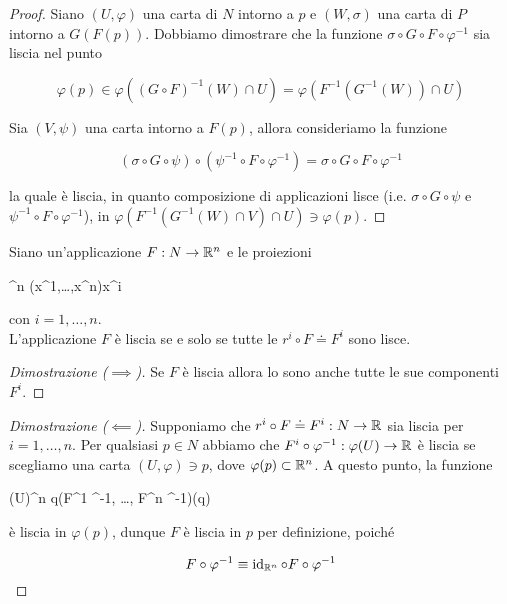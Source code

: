 \begin{proof}
	Siano $ (U,\varphi) $ una carta di $ N $ intorno a $ p $ e $ (W,\sigma) $ una carta di $ P $ intorno a $ G(F(p)) $. Dobbiamo dimostrare che la funzione $ \sigma \circ G \circ F \circ \varphi^{-1} $ sia liscia nel punto
	
	\begin{equation}
		\varphi(p) \in \varphi((G \circ F)^{-1}(W) \cap U) = \varphi(F^{-1}(G^{-1}(W)) \cap U)
	\end{equation}
	
	Sia $ (V,\psi) $ una carta intorno a $ F(p) $, allora consideriamo la funzione
	
	\begin{equation}
		(\sigma \circ G \circ \psi) \circ (\psi^{-1} \circ F \circ \varphi^{-1}) = \sigma \circ G \circ F \circ \varphi^{-1}
	\end{equation}

	la quale è liscia, in quanto composizione di applicazioni lisce (i.e. $ \sigma \circ G \circ \psi $ e $ \psi^{-1} \circ F \circ \varphi^{-1} $), in $ \varphi(F^{-1}(G^{-1}(W) \cap V) \cap U) \ni \varphi(p) $.
\end{proof}

\begin{definition}[Componenti]\label{prop:map-comp}
	Siano un'applicazione $ F : N \to \mathbb{R}^{n} $ e le proiezioni
	
		{\R^{n}}{\R}
		{(x^{1},\dots,x^{n})}{x^{i}}

	con $ i=1,\dots,n $. \\
	L'applicazione $ F $ è liscia se e solo se tutte le $ r^{i} \circ F \doteq F^{i} $ sono lisce.
\end{definition}

\begin{proof}[Dimostrazione ($ \implies $)]
	Se $ F $ è liscia allora lo sono anche tutte le sue componenti $ F^{i} $.
\end{proof}

\begin{proof}[Dimostrazione ($ \impliedby $)]
	Supponiamo che $ r^{i} \circ F \doteq F^{i} : N \to \mathbb{R} $ sia liscia per $ i=1,\dots,n $. Per qualsiasi $ p \in N $ abbiamo che $ F^{i} \circ \varphi^{-1} : \varphi(U) \to \mathbb{R} $ è liscia se scegliamo una carta $ (U,\varphi) \ni p $, dove $ \varphi(p) \subset \mathbb{R}^{n} $. A questo punto, la funzione
	
		{\varphi(U)}{\R^{n}}
		{q}{(F^{1} \circ \varphi^{-1}, \dots, F^{n} \circ \varphi^{-1})(q)}

	è liscia in $ \varphi(p) $, dunque $ F $ è liscia in $ p $ per definizione, poiché
	
	\begin{equation}
		F \circ \varphi^{-1} \equiv \operatorname{id}_{\mathbb{R}^{n}} \circ F \circ \varphi^{-1}
	\end{equation}
\end{proof}

